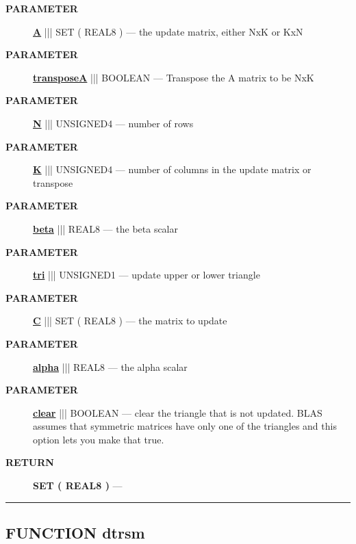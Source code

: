 \par
\begin{description}
\item [\colorbox{tagtype}{\color{white} \textbf{\textsf{PARAMETER}}}] \textbf{\underline{A}} ||| SET ( REAL8 ) --- the update matrix, either NxK or KxN
\item [\colorbox{tagtype}{\color{white} \textbf{\textsf{PARAMETER}}}] \textbf{\underline{transposeA}} ||| BOOLEAN --- Transpose the A matrix to be NxK
\item [\colorbox{tagtype}{\color{white} \textbf{\textsf{PARAMETER}}}] \textbf{\underline{N}} ||| UNSIGNED4 --- number of rows
\item [\colorbox{tagtype}{\color{white} \textbf{\textsf{PARAMETER}}}] \textbf{\underline{K}} ||| UNSIGNED4 --- number of columns in the update matrix or transpose
\item [\colorbox{tagtype}{\color{white} \textbf{\textsf{PARAMETER}}}] \textbf{\underline{beta}} ||| REAL8 --- the beta scalar
\item [\colorbox{tagtype}{\color{white} \textbf{\textsf{PARAMETER}}}] \textbf{\underline{tri}} ||| UNSIGNED1 --- update upper or lower triangle
\item [\colorbox{tagtype}{\color{white} \textbf{\textsf{PARAMETER}}}] \textbf{\underline{C}} ||| SET ( REAL8 ) --- the matrix to update
\item [\colorbox{tagtype}{\color{white} \textbf{\textsf{PARAMETER}}}] \textbf{\underline{alpha}} ||| REAL8 --- the alpha scalar
\item [\colorbox{tagtype}{\color{white} \textbf{\textsf{PARAMETER}}}] \textbf{\underline{clear}} ||| BOOLEAN --- clear the triangle that is not updated. BLAS assumes that symmetric matrices have only one of the triangles and this option lets you make that true.
\end{description}







\par
\begin{description}
\item [\colorbox{tagtype}{\color{white} \textbf{\textsf{RETURN}}}] \textbf{SET ( REAL8 )} --- 
\end{description}




\rule{\linewidth}{0.5pt}
\subsection*{\textsf{\colorbox{headtoc}{\color{white} FUNCTION}
dtrsm}}

